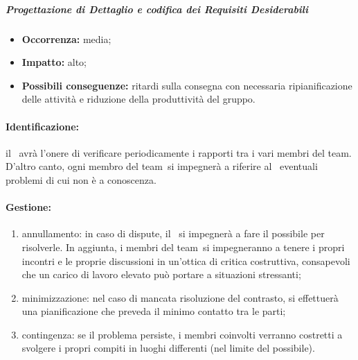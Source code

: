 \documentclass[../PianoProgetto.tex]{subfiles}
\begin{document}
		\subparagraph*{Progettazione di Dettaglio e codifica dei Requisiti Desiderabili}
			\begin{itemize}[label={-}]
				\item \textbf{Occorrenza:} media;
				\item \textbf{Impatto:} alto;
				\item \textbf{Possibili conseguenze:} ritardi sulla consegna con necessaria ripianificazione delle attività e riduzione della produttività del gruppo.
			\end{itemize}
			
	
	\paragraph*{Identificazione:} il \responsabilediprogetto\ avrà l'onere di verificare periodicamente i rapporti tra i vari membri del team\g. D'altro canto, ogni membro del team\g\ si impegnerà a riferire al \responsabilediprogetto\ eventuali problemi di cui non è a conoscenza.
	
	\paragraph*{Gestione:}
	\begin{enumerate}
		\item annullamento: in caso di dispute, il \responsabilediprogetto\ si impegnerà a fare il possibile per risolverle. In aggiunta, i membri del team\g\ si impegneranno a tenere i propri incontri e le proprie discussioni in un'ottica di critica costruttiva, consapevoli che un carico di lavoro elevato può portare a situazioni stressanti;
		\item minimizzazione: nel caso di mancata risoluzione del contrasto, si effettuerà una pianificazione che preveda il minimo contatto tra le parti; 
		\item contingenza: se il problema persiste, i membri coinvolti verranno costretti a svolgere i propri compiti in luoghi differenti (nel limite del possibile).
	\end{enumerate}	
	
\end{document}
